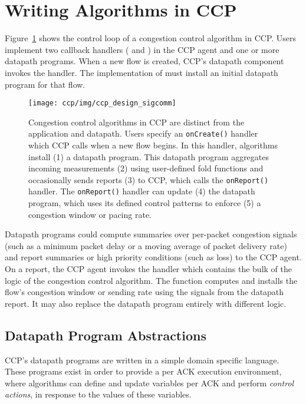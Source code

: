 \section{Writing Algorithms in CCP}
\label{sec:ccp}
%
Figure~\ref{fig:design} shows the control loop of a congestion control algorithm in CCP.
Users implement two callback handlers ( and ) in the CCP agent
and one or more datapath programs.
When a new flow is created, CCP's datapath component invokes the  handler.
The implementation of  must install an initial datapath program for that flow.
\begin{figure}
\centering
    \texttt{[image: ccp/img/ccp\_design\_sigcomm]}
    \caption{Congestion control algorithms in CCP are distinct from the application and datapath.
    Users specify an \texttt{onCreate()} handler which CCP calls when a new flow begins. 
    In this handler, algorithms install (1) a datapath program. 
    This datapath program aggregates incoming measurements (2) using user-defined fold functions and occasionally sends reports (3) to CCP, which calls the \texttt{onReport()} handler.
    The \texttt{onReport()} handler can update (4) the datapath program, which uses its defined control patterns to enforce (5) a congestion window or pacing rate.
    }\label{fig:design}
\end{figure}
%
Datapath programs could compute summaries over per-packet
congestion signals (such as a minimum packet delay or a moving average of packet
delivery rate) and report summaries or high priority conditions
(such as loss) to the CCP agent.
On a report, the CCP agent invokes the  handler
which contains the bulk of the logic of the congestion control algorithm.
The  function computes and installs the flow's congestion
window or sending rate using the signals from the datapath report.
It may also replace the datapath program entirely with different logic.

\subsection{Datapath Program Abstractions}
\label{s:ccp:datapath_programs}
CCP's datapath programs are written in a simple domain specific language.
These programs exist in order to provide a per ACK execution environment, where algorithms can define and update variables per ACK and perform \textit{control actions}, in response to the values of these variables.

